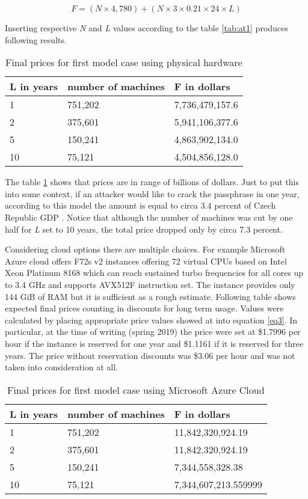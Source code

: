 \documentclass[nolof,digital]{fithesis3}
\begin{document}
$$F = ( N \times 4,780 ) + ( N \times 3 \times 0.21 \times 24 \times L)$$

Inserting respective \emph{N} and \emph{L} values according to the table \ref{tab:at1} produces following results.

\noindent
\begin{table}
\caption{Final prices for first model case using physical hardware}
\label{tab:at2}
\begin{tabularx}{\textwidth}{| X | X | X |}
\hline
L  in years & number of machines & F in dollars\\
\hline
1 & 751,202 & 7,736,479,157.6\\
\hline
2 & 375,601 & 5,941,106,377.6\\
\hline
5 & 150,241 & 4,863,902,134.0\\
\hline
10 & 75,121 & 4,504,856,128.0\\
\hline
\end{tabularx}
\end{table}

The table \ref{tab:at2} shows that prices are in range of billions of dollars. Just to put this into some context, if an attacker would like to crack the passphrase in one year, according to this model the amount is equal to circa 3.4 percent of Czech Republic GDP \parencite{czechgdp}. Notice that although the number of machines was cut by one half for \emph{L} set to 10 years, the total price dropped only by circa 7.3 percent.

Considering cloud options there are multiple choices. For example Microsoft Azure cloud offers F72s v2 instances offering 72 virtual CPUs based on Intel Xeon Platinum 8168 which can reach sustained turbo frequencies for all cores up to 3.4 GHz and supports AVX512F instruction set. The instance provides only 144 GiB of RAM but it is sufficient as a rough estimate. Following table shows expected final prices counting in discounts for long term usage. Values were calculated by placing appropriate price values showed at \parencite{azure} into equation \ref{eq3}. In particular, at the time of writing (spring 2019) the price were set at \$1.7996 per hour if the instance is reserved for one year and \$1.1161 if it is reserved for three years. The price without reservation discounts was \$3.06 per hour and was not taken into consideration at all.

\noindent
\begin{table}
\caption{Final prices for first model case using Microsoft Azure Cloud}
\label{tab:at3}
\begin{tabularx}{\textwidth}{| X | X | X |}
\hline
L  in years & number of machines & F in dollars\\
\hline
1 & 751,202 & 11,842,320,924.19\\
\hline
2 & 375,601 & 11,842,320,924.19\\
\hline
5 & 150,241 & 7,344,558,328.38\\
\hline
10 & 75,121 & 7,344,607,213.559999\\
\hline
\end{tabularx}
\end{table}
\end{document}
